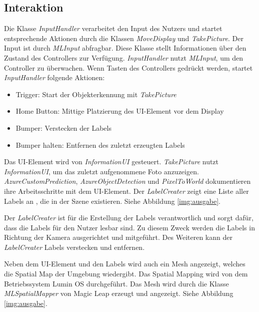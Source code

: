 \subsection{Interaktion}

Die Klasse \textit{InputHandler} verarbeitet den Input des Nutzers und startet entsprechende Aktionen durch die Klassen \textit{MoveDisplay} und \textit{TakePicture}. Der Input ist durch \textit{MLInput} abfragbar. Diese Klasse stellt Informationen über den Zustand des Controllers zur Verfügung. \textit{InputHandler} nutzt \textit{MLInput}, um den Controller zu überwachen. Wenn  Tasten des Controllers gedrückt werden, startet \textit{InputHandler} folgende Aktionen:

\begin{itemize}
	\item Trigger: Start der Objekterkennung mit \textit{TakePicture}
	\item Home Button: Mittige Platzierung des UI-Element vor dem Display
	\item Bumper: Verstecken der Labels
	\item Bumper halten: Entfernen des zuletzt erzeugten Labels
\end{itemize}

Das UI-Element wird von \textit{InformationUI} gesteuert. \textit{TakePicture} nutzt \textit{InformationUI}, um das zuletzt aufgenommene Foto anzuzeigen. \textit{AzureCustomPrediction}, \textit{AzureObjectDetection} und \textit{PixelToWorld} dokumentieren ihre Arbeitsschritte mit dem UI-Element. Der \textit{LabelCreater} zeigt eine Liste aller Labels an , die in der Szene existieren. Siehe Abbildung \ref{img:ausgabe}.


Der \textit{LabelCreater} ist für die Erstellung der Labels verantwortlich und sorgt dafür, dass die Labels für den Nutzer lesbar sind. Zu diesem Zweck werden die Labels in Richtung der Kamera ausgerichtet und mitgeführt. Des Weiteren kann der \textit{LabelCreater} Labels verstecken und entfernen.

Neben dem UI-Element und den Labels wird auch ein Mesh angezeigt, welches die Spatial Map der Umgebung wiedergibt. Das Spatial Mapping wird von dem Betriebssystem Lumin OS durchgeführt. Das Mesh wird durch die Klasse \textit{MLSpatialMapper} von Magic Leap erzeugt und angezeigt. Siehe Abbildung \ref{img:ausgabe}.

